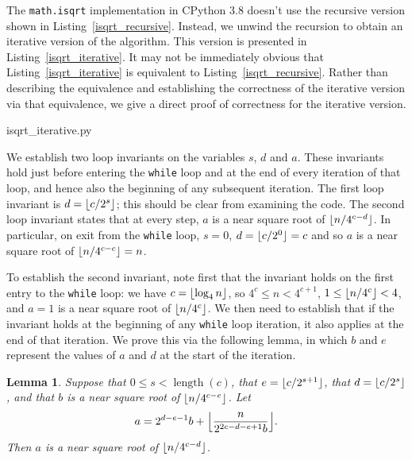 \documentclass[a4paper]{article}
\DeclarePairedDelimiter\floor{\lfloor}{\rfloor}
\DeclareMathOperator{\length}{length}
\theoremstyle{plain}
\newtheorem{lemma}[theorem]{Lemma}
\theoremstyle{definition}
\begin{document}
The \lstinline{math.isqrt} implementation in CPython 3.8 doesn't use the
recursive version shown in Listing~\ref{isqrt_recursive}. Instead, we unwind
the recursion to obtain an iterative version of the algorithm. This version is
presented in Listing~\ref{isqrt_iterative}. It may not be immediately obvious
that Listing~\ref{isqrt_iterative} is equivalent to
Listing~\ref{isqrt_recursive}. Rather than describing the equivalence and
establishing the correctness of the iterative version via that equivalence,
we give a direct proof of correctness for the iterative version.


  {isqrt_iterative.py}


We establish two loop invariants on the variables $s$, $d$ and $a$. These
invariants hold just before entering the \lstinline$while$ loop and at the end
of every iteration of that loop, and hence also the beginning of any subsequent
iteration. The first loop invariant is $d = \floor{c/2^s}$; this should be
clear from examining the code. The second loop invariant states that at every
step, $a$ is a near square root of $\floor{n / 4^{c-d}}$. In particular, on
exit from the \lstinline$while$ loop, $s = 0$, $d = \floor{c/2^0} = c$ and so
$a$ is a near square root of $\floor{n / 4^{c-c}} = n$.

To establish the second invariant, note first that the invariant holds on the
first entry to the \lstinline$while$ loop: we have $c = \floor{\log_4 n}$, so
$4^c \le n < 4^{c+1}$, $1 \le \floor{n / 4^c} < 4$, and $a = 1$ is a near
square root of $\floor{n / 4^c}$. We then need to establish that if the
invariant holds at the beginning of any \lstinline$while$ loop iteration, it
also applies at the end of that iteration. We prove this via the following
lemma, in which $b$ and $e$ represent the values of $a$ and $d$ at the start of
the iteration.

\begin{lemma}
  Suppose that $0 \le s < \length(c)$, that $e = \floor{c / 2^{s + 1}}$, that
  $d = \floor{c / 2^s}$, and that $b$ is a near square root of $\floor{n /
  4^{c-e}}$. Let
  $$a = 2^{d-e-1}b + \floor*{\frac{n}{2^{2c-d-e+1}b}}.$$ Then $a$ is a near
  square root of $\floor{n / 4^{c-d}}$.
\end{lemma}
\end{document}
